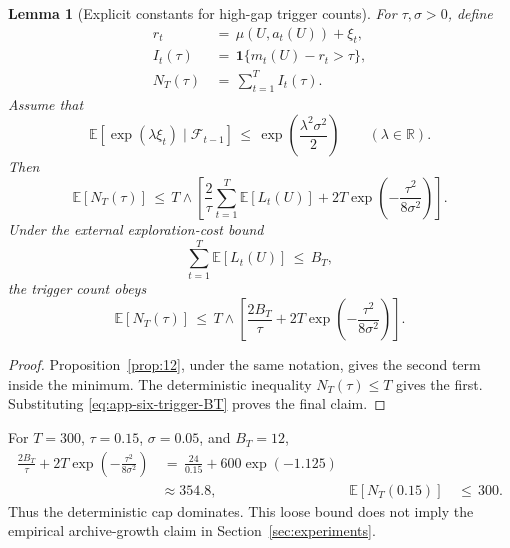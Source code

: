 \documentclass{article} %
\newtheorem{lemma}[theorem]{Lemma}
\begin{document}
\begin{lemma}[Explicit constants for high-gap trigger counts]
\label{lem:17}
For \(\tau,\sigma>0\), define
\begin{align}
\label{eq:app-six-trigger-reward}
r_t
&\,=\,
\mu(U,a_t(U))+\xi_t,
\\
\label{eq:app-six-trigger-indicator}
I_t(\tau)
&\,=\,
\mathbf{1}\{m_t(U)-r_t>\tau\},
\\
\label{eq:app-six-trigger-count}
N_T(\tau)
&\,=\,
\sum_{t=1}^{T}I_t(\tau).
\end{align}
Assume that
\begin{equation}
\label{eq:app-six-trigger-subg}
\mathbb{E}\!\left[\exp(\lambda \xi_t)\mid \mathcal{F}_{t-1}\right]
\,\le\,
\exp\!\left(\frac{\lambda^2\sigma^2}{2}\right)
\qquad(\lambda\in\mathbb R).
\end{equation}
Then
\begin{equation}
\label{eq:app-six-trigger-bound}
\mathbb{E}[N_T(\tau)]
\,\le\,
T
\wedge
\left[
\frac{2}{\tau}\sum_{t=1}^{T}\mathbb{E}[L_t(U)]
+
2T\exp\!\left(-\frac{\tau^2}{8\sigma^2}\right)
\right].
\end{equation}
Under the external exploration-cost bound
\begin{equation}
\label{eq:app-six-trigger-BT}
\sum_{t=1}^{T}\mathbb{E}[L_t(U)]\,\le\, B_T,
\end{equation}
the trigger count obeys
\begin{equation}
\label{eq:app-six-trigger-BT-bound}
\mathbb{E}[N_T(\tau)]
\,\le\,
T
\wedge
\left[
\frac{2B_T}{\tau}
+
2T\exp\!\left(-\frac{\tau^2}{8\sigma^2}\right)
\right].
\end{equation}
\end{lemma}

\begin{proof}
Proposition~\ref{prop:12}, under the same notation, gives the second term
inside the minimum. The deterministic inequality \(N_T(\tau)\leq T\) gives
the first. Substituting \eqref{eq:app-six-trigger-BT} proves the final claim.
\end{proof}

For \(T=300\), \(\tau=0.15\), \(\sigma=0.05\), and \(B_T=12\),
\begin{equation}
\begin{aligned}
\frac{2B_T}{\tau}
+
2T\exp\!\left(-\frac{\tau^2}{8\sigma^2}\right)
&\,=\,
\frac{24}{0.15}
+
600\exp(-1.125)
\\
&\approx
354.8,
&
\mathbb E[N_T(0.15)]
&\,\leq\,300.
\end{aligned}
\end{equation}
Thus the deterministic cap dominates. This loose bound does not imply the
empirical archive-growth claim in Section~\ref{sec:experiments}.
\end{document}
